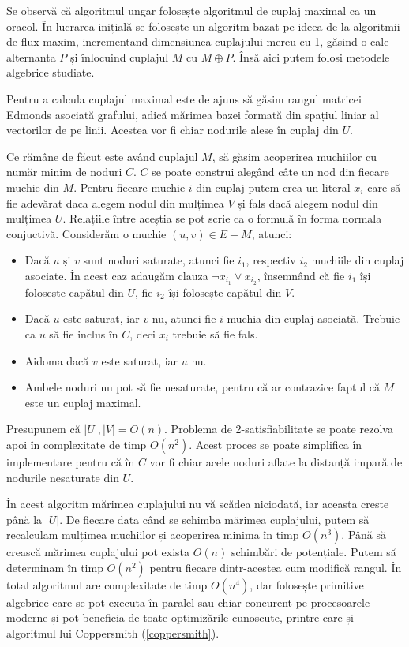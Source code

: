 Se observă că algoritmul ungar folosește algoritmul de cuplaj maximal ca un oracol. În lucrarea inițială se folosește un algoritm bazat pe
ideea de la algoritmii de flux maxim, incrementand dimensiunea cuplajului mereu cu 1, găsind o cale alternanta $P$ și înlocuind cuplajul $M$
cu $M \oplus P$. Însă aici putem folosi metodele algebrice studiate.

Pentru a calcula cuplajul maximal este de ajuns să găsim rangul matricei Edmonds asociată grafului, adică mărimea bazei formată din spațiul
liniar al vectorilor de pe linii. Acestea vor fi chiar nodurile alese în cuplaj din $U$.

Ce rămâne de făcut este având cuplajul $M$, să găsim acoperirea muchiilor cu număr minim de noduri $C$. $C$ se poate construi alegând
câte un nod din fiecare muchie din $M$. Pentru fiecare muchie $i$ din cuplaj putem crea un literal $x_{i}$ care să fie adevărat daca alegem
nodul din mulțimea $V$ și fals dacă alegem nodul din mulțimea $U$. Relațiile între aceștia se pot scrie ca o formulă în forma normala conjuctivă. Considerăm o muchie $(u,v) \in E - M$, atunci:
\begin{itemize}
  \item Dacă $u$ și $v$ sunt noduri saturate, atunci fie $i_{1}$, respectiv $i_{2}$ muchiile din cuplaj asociate. În acest caz adaugăm clauza
  $\neg x_{i_{1}} \lor x_{i_{2}}$, însemnând că fie $i_{1}$ își folosește capătul din $U$, fie $i_{2}$ își folosește capătul din $V$.
  \item Dacă $u$ este saturat, iar $v$ nu, atunci fie $i$ muchia din cuplaj asociată. Trebuie ca $u$ să fie inclus în $C$, deci $x_{i}$ trebuie
  să fie fals.
  \item Aidoma dacă $v$ este saturat, iar $u$ nu.
  \item Ambele noduri nu pot să fie nesaturate, pentru că ar contrazice faptul că $M$ este un cuplaj maximal.
\end{itemize}

Presupunem că $|U|, |V| = O(n)$. Problema de 2-satisfiabilitate se poate rezolva apoi în complexitate de timp $O(n^{2})$.
Acest proces se poate simplifica în implementare pentru că în $C$ vor fi chiar acele noduri aflate la distanță impară de nodurile nesaturate din $U$.

În acest algoritm mărimea cuplajului nu vă scădea niciodată, iar aceasta creste până la $|U|$. De fiecare data când se schimba
mărimea cuplajului, putem să recalculam mulțimea muchiilor și acoperirea minima în timp $O(n^{3})$. Până să crească mărimea
cuplajului pot exista $O(n)$ schimbări de potențiale. Putem să determinam în timp $O(n^{2})$ pentru fiecare dintr-acestea
cum modifică rangul. În total algoritmul are complexitate de timp $O(n^{4})$, dar folosește primitive algebrice care se pot
executa în paralel sau chiar concurent pe procesoarele moderne și pot beneficia de toate optimizările cunoscute, printre care
și algoritmul lui Coppersmith (\ref{coppersmith}).

